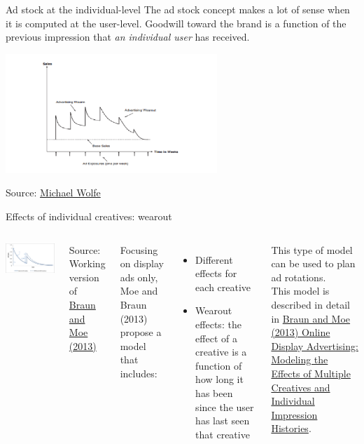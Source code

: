 \documentclass[10pt, aspectratio=169]{beamer}
\newcommand{\source}[1]{\begin{flushright} \footnotesize Source: {#1} \end{flushright} \normalsize}
\begin{document}
\begin{frame}{Ad stock at the individual-level}
The ad stock concept makes a lot of sense when it is computed at the user-level.  Goodwill toward the brand is a function of the previous impression that \emph{an individual user} has received.  
\begin{center}
\includegraphics[width=0.6\textwidth]{images/adresponseovertime.png}
\end{center} 
\source{\href{https://www.linkedin.com/pulse/new-tools-determining-measuring-wear-in-wear-out-media-michael-wolfe}{Michael Wolfe}}
\end{frame}

\begin{frame}{Effects of individual creatives: wearout}
\begin{columns}
\includegraphics[width=\textwidth]{images/ad_stock_over_time.png}
\source{Working version of \href{https://goo.gl/nbZCcN}{Braun and Moe (2013)}}
Focusing on display ads only, Moe and Braun (2013) propose a model that includes: 
\begin{itemize}
\item Different effects for each creative
\item Wearout effects: the effect of a creative is a function of how long it has been since the user has last seen that creative
\end{itemize}
This type of model can be used to plan ad rotations.\\
\bigskip
This model is described in detail in \href{https://goo.gl/nbZCcN}{Braun and Moe (2013) Online Display Advertising: Modeling the Effects of Multiple Creatives and Individual Impression Histories}.
\end{columns}
\end{frame}
\end{document}

